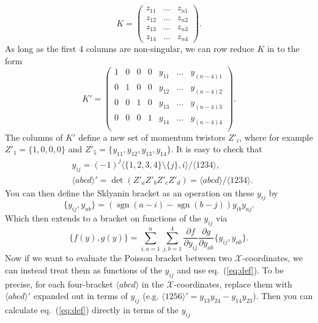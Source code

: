 \documentclass[11pt]{article}
\DeclareMathOperator{\sgn}{sgn}
\def\ket#1{\langle #1 \rangle}
\begin{document}
\begin{equation}  
K = \left(\begin{array}{ccc}
z_{11} & \ldots & z_{n1} \\
z_{12} & \ldots & z_{n2} \\
z_{13} & \ldots & z_{n3} \\
z_{14} & \ldots & z_{n4}\end{array}\right).
\end{equation}
As long as the first 4 columns are non-singular, we can row reduce $K$ in to the form
\begin{equation}
K'=\left(
\begin{array}{ccccccc}
 1 & 0 & 0 & 0 & y_{11} & \ldots  & y_{(n-4)1} \\
 0 & 1 & 0 & 0 & y_{12} & \ldots  & y_{(n-4)2} \\
 0 & 0 & 1 & 0 & y_{13} & \ldots  & y_{(n-4)3} \\
 0 & 0 & 0 & 1 & y_{14} & \ldots  & y_{(n-4)4} \\
\end{array}
\right).
\end{equation}
The columns of $K'$ define a new set of momentum twistors $Z'_i$, where for example $Z'_1 = \{1,0,0,0\}$ and $Z'_5 = \{y_{11},y_{12},y_{13},y_{14}\}$. It is easy to check that 
\begin{align}
   &y_{ij} = (-1)^j \ket{\{1,2,3,4\}\setminus\{j\},i}/\ket{1234},\\
   &\ket{abcd}' = \det(Z'_a Z'_b Z'_c Z'_d) = \ket{abcd}/\ket{1234}.
\end{align}
You can then define the Sklyanin bracket as an operation on these $y_{ij}$ by
\begin{equation}
   \{y_{ij},y_{ab}\} = (\sgn(a-i) - \sgn(b-j)) y_{ib} y_{aj}.
\end{equation}
Which then extends to a bracket on functions of the $y_{ij}$ via
\begin{equation}\label{eq:def}
   \{f(y), g(y)\} =  \sum_{i,a=1}^n\sum_{j,b=1}^4\frac{\partial f}{\partial y_{ij}}  \frac{\partial g}{\partial y_{ab}} 
\{y_{ij}, y_{ab}\}.
\end{equation}
Now if we want to evaluate the Poisson bracket between two $\mathcal{X}$-coordinates, we can instead treat them as functions of the $y_{ij}$ and use eq.~(\ref{eq:def}). To be precise, for each four-bracket $\ket{abcd}$ in the $\mathcal{X}$-coordinates, replace them with $\ket{abcd}'$ expanded out in terms of $y_{ij}$ (e.g. $\ket{1256}' =y_{13} y_{24}-y_{14} y_{23}$). Then you can calculate eq.~(\ref{eq:def}) directly in terms of the $y_{ij}$
\end{document}
